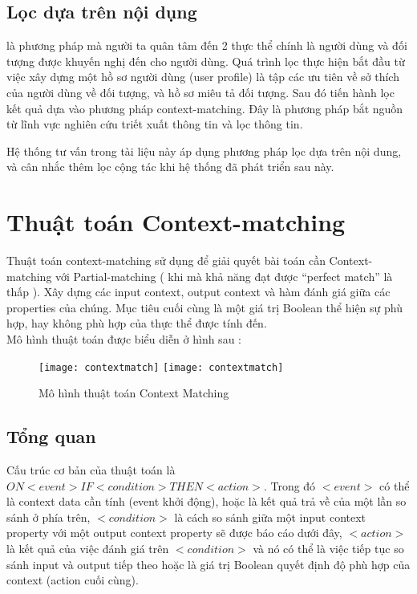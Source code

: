 \subsection{Lọc dựa trên nội dụng} là phương pháp mà người ta quân tâm đến 2 thực thể chính là người dùng và đối tượng được khuyến nghị đến cho người dùng. Quá trình lọc thực hiện bắt đầu từ việc xây dựng một hồ sơ người dùng (user profile) là tập các ưu tiên về sở thích của người dùng về đối tượng, và hồ sơ miêu tả đối tượng. Sau đó tiến hành lọc kết quả dựa vào phương pháp context-matching. Đây là phương pháp bắt nguồn từ lĩnh vực nghiên cứu triết xuất thông tin và lọc thông tin.

Hệ thống tư vấn trong tài liệu này áp dụng phương pháp lọc dựa trên nội dung, và cân nhắc thêm lọc cộng tác khi hệ thống đã phát triển sau này.

\section{Thuật toán Context-matching}
Thuật toán context-matching\cite{moore11} sử dụng để giải quyết bài toán cần Context-matching với Partial-matching ( khi mà khả năng đạt được “perfect match” là thấp ). Xây dựng các input context, output context và hàm đánh giá giữa các properties của chúng. Mục tiêu cuối cùng là một giá trị Boolean thể hiện sự phù hợp, hay không phù hợp của thực thể được tính đến.\\

Mô hình thuật toán \cite{haipv12} được biểu diễn ở hình sau : 

\begin{figure}[!htbp]
  \begin{center}
    \ifpdf
      \texttt{[image: contextmatch]}
    \else
      \texttt{[image: contextmatch]}
    \fi
    \caption{Mô hình thuật toán Context Matching }
    \label{ContextMatching}
  \end{center}
\end{figure}
\subsection{Tổng quan}	
\label{ContextMatchingTheory}
Cấu trúc cơ bản của thuật toán là ${ON <event> IF <condition> THEN <action>}$. Trong đó $<event>$ có thể là context data cần tính (event khởi động), hoặc là kết quả trả về của một lần so sánh ở phía trên, $<condition>$ là cách so sánh giữa một input context property với một output context property sẽ được báo cáo dưới đây, $<action>$ là kết quả của việc đánh giá trên $<condition>$ và nó có thể là việc tiếp tục so sánh input và output tiếp theo hoặc là giá trị Boolean quyết định độ phù hợp của context (action cuối cùng).
